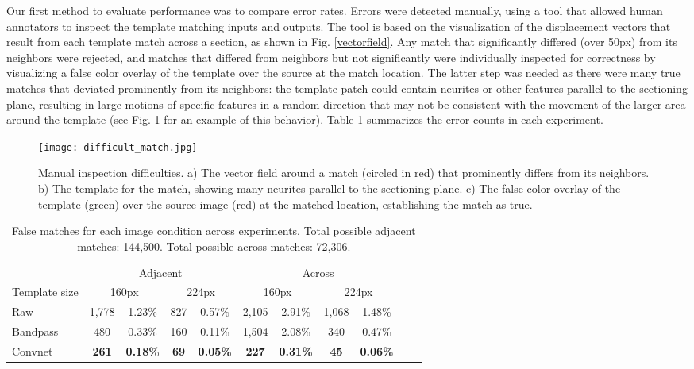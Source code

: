 \documentclass{article}
\begin{document}
Our first method to evaluate performance was to compare error rates. Errors were detected manually, using a tool that allowed human annotators to inspect the template matching inputs and outputs. The tool is based on the visualization of the displacement vectors that result from each template match across a section, as shown in Fig. \ref{vectorfield}. Any match that significantly differed (over 50px) from its neighbors were rejected, and matches that differed from neighbors but not significantly were individually inspected for correctness by visualizing a false color overlay of the template over the source at the match location. The latter step was needed as there were many true matches that deviated prominently from its neighbors: the template patch could contain neurites or other features parallel to the sectioning plane, resulting in large motions of specific features in a random direction that may not be consistent with the movement of the larger area around the template (see Fig. \ref{difficult_match} for an example of this behavior). Table \ref{table:error_rates} summarizes the error counts in each experiment.

\begin{figure}[h]
  \centering
  \texttt{[image: difficult\_match.jpg]}
  \caption{Manual inspection difficulties. a) The vector field around a match (circled in red) that prominently differs from its neighbors. b) The template for the match, showing many neurites parallel to the sectioning plane. c) The false color overlay of the template (green) over the source image (red) at the matched location, establishing the match as true.}
  \label{difficult_match}
\end{figure}

 

\begin{table}[h]
    \caption{False matches for each image condition across experiments. Total possible adjacent matches: 144,500. Total possible across matches: 72,306.}
    \centering
     \small
    \begin{tabular}{l*{9}{c}r}
    
        \toprule
        &  \multicolumn{4}{c}{Adjacent}   &  \multicolumn{4}{c}{Across}\\
        \cmidrule{2-9}
        Template size    & \multicolumn{2}{c}{160px}  & \multicolumn{2}{c}{224px} & \multicolumn{2}{c}{160px} & \multicolumn{2}{c}{224px} \\
        \hline
        Raw             & 1,778 & 1.23\% & 827 & 0.57\% & 2,105 & 2.91\% & 1,068 & 1.48\% \\
        Bandpass        & 480 & 0.33\% & 160 & 0.11\% & 1,504 & 2.08\% & 340 & 0.47\% \\
        Convnet         & \textbf{261} & \textbf{0.18\%} & \textbf{69} & \textbf{0.05\%} & \textbf{227} & \textbf{0.31\%} & \textbf{45} & \textbf{0.06\%} &  \\
        \bottomrule
    \end{tabular}
\label{table:error_rates}
\end{table}
\end{document}
